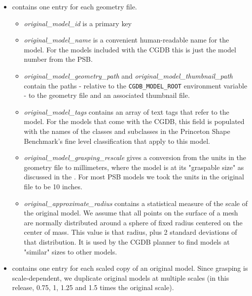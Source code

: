 \begin{itemize}
	\item {} contains one entry for each geometry file.
		\begin{itemize}
			\item \emph{original\_model\_id} is a primary key
			\item \emph{original\_model\_name} is a convenient
              human-readable name for the model. For the models
              included with the CGDB this is just the model number
              from the PSB.
			\item \emph{original\_model\_geometry\_path} and
              \emph{original\_model\_thumbnail\_path} contain the
              paths - relative to the \texttt{CGDB\_MODEL\_ROOT}
              environment variable - to the geometry file and an
              associated thumbnail file.
			\item \emph{original\_model\_tags} contains an array of
              text tags that refer to the model. For the models that
              come with the CGDB, this field is populated with the
              names of the classes and subclasses in the Princeton
              Shape Benchmark's fine level classification that apply
              to this model.
			\item \emph{original\_model\_grasping\_rescale} gives a
              conversion from the units in the geometry file to
              millimeters, where the model is at its "graspable size"
              as discussed in the . For most PSB models we took the
              units in the original file to be 10 inches.
			\item \emph{original\_approximate\_radius} contains a
              statistical measure of the scale of the original
              model. We assume that all points on the surface of a
              mesh are normally distributed around a sphere of fixed
              radius centered on the center of mass. This value is
              that radius, plus 2 standard deviations of that
              distribution. It is used by the CGDB planner to find
              models at "similar" sizes to other models.
		\end{itemize}
	\item {} contains one entry for each scaled
      copy of an original model. Since grasping is scale-dependent, we
      duplicate original models at multiple scales (in this release,
      0.75, 1, 1.25 and 1.5 times the original scale).

\end{itemize}
